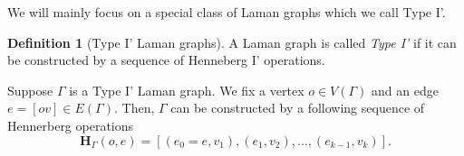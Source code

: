 \documentclass[11pt]{amsart}
\theoremstyle{definition}
\newtheorem{defn}[thm]{Definition}
\theoremstyle{remark}
\numberwithin{equation}{section}
\begin{document}
We will mainly focus on a special class of Laman graphs which we call Type I'.
\begin{defn}[Type I' Laman graphs]
  A Laman graph is called \textit{Type I'} if it can be constructed by a sequence of Henneberg I' operations.
\end{defn}
\iffalse
Given a type 1 Laman graph $\Gamma$, we choose a vertex $o\in V(\Gamma)$ as the base point and fix an edge $e\in E(\Gamma)$ such that $V(e)=\{o,v\}$. From the triple $(\Gamma,o,e)$, one can obtain a poset $\mathbf{H}_{\Gamma}(o,e)$ such that its underlying set is $V(\Gamma)$. For each $u\in \mathbf{H}_{\Gamma}(o,e)-\{o,v\}$, the lower cover set $C_u=\{u',u''\}$ has cardinality 2 and $u',u''$ are comparable. Furthermore, let $C_{<u}=\{v_1,v_2\}$ , we have $v_1\in C_{<v_2}$ or $v_2\in C_{<v_1}$.

From the poset $\mathbf{H}_{\Gamma}(o,e)$, we can choose a total order extension $\vec{\mathbf{H}}_{\Gamma}(o,e)$. Each total order extension corresponds to a sequence of Hennerberg moves which starts from $(o,e)$ and results in $\Gamma$.
\fi

Suppose $\Gamma$ is a Type I' Laman graph. 
We fix a vertex $o\in V(\Gamma)$ and an edge $e=[ov]\in E(\Gamma)$.
Then, $\Gamma$ can be constructed by a following sequence of Hennerberg operations
$$
\mathbf{H}_{\Gamma}(o,e)=[(e_0=e,v_1),(e_1,v_2),\dots,(e_{k-1},v_k)].
$$
\end{document}
